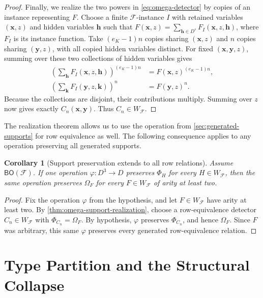 \documentclass[11pt,letterpaper,onecolumn]{article}
\theoremstyle{plain}
\newtheorem{corollary}[corollary]{Corollary}
\theoremstyle{definition}
\theoremstyle{remark}
\newcommand{\cF}{\mathcal F}
\newcommand{\BO}{\mathsf{BO}}
\newcommand{\SuppRel}[1]{\Phi_{#1}}
\newcommand{\RowEq}[1]{\Omega_{#1}}
\begin{document}
\begin{proof}
Finally, we realize the two powers in \eqref{eq:omega-detector} by
copies of an instance representing $F$.  Choose a finite $\cF$-instance $I$
with retained variables $(\mathbf x,z)$ and hidden variables $\mathbf h$
such that $F(\mathbf x,z)=\sum_{\mathbf h\in D^s}F_I(\mathbf x,z,\mathbf h)$,
where $F_I$ is its instance function.  Take $(e_K-1)n$ copies sharing
$(\mathbf x,z)$ and $n$ copies sharing $(\mathbf y,z)$, with all copied
hidden variables distinct.  For fixed $(\mathbf x,\mathbf y,z)$, summing
over these two collections of hidden variables gives
\begin{align*}
  \left(\sum_{\mathbf h}F_I(\mathbf x,z,\mathbf h)\right)^{(e_K-1)n}
    &=F(\mathbf x,z)^{(e_K-1)n},\\
  \left(\sum_{\mathbf k}F_I(\mathbf y,z,\mathbf k)\right)^n
    &=F(\mathbf y,z)^n.
\end{align*}
Because the collections are disjoint, their contributions multiply.
Summing over $z$ now gives exactly $C_n(\mathbf x,\mathbf y)$.
Thus $C_n\in W_{\cF}$.
\end{proof}

The realization theorem allows us to use the operation from
\cref{sec:generated-supports} for row equivalence as well.  The following
consequence applies to any operation preserving all generated supports.

\begin{corollary}[Support preservation extends to all row relations]
\label{cor:omega-reduces-to-supports}
Assume $\BO(\cF)$.  If one operation $\varphi:D^3\to D$ preserves $\SuppRel H$
for every $H\in W_{\cF}$, then the same operation preserves $\RowEq F$ for
every $F\in W_{\cF}$ of arity at least two.
\end{corollary}

\begin{proof}
Fix the operation $\varphi$ from the hypothesis, and let
$F\in W_{\cF}$ have arity at least two.  By
\cref{thm:omega-support-realization}, choose a row-equivalence detector
$C_n\in W_{\cF}$ with $\SuppRel{C_n}=\RowEq F$.  By hypothesis,
$\varphi$ preserves $\SuppRel{C_n}$, and hence $\RowEq F$.
Since $F$ was arbitrary, this same $\varphi$ preserves every generated
row-equivalence relation.
\end{proof}

\section{Type Partition and the Structural Collapse}
\label{sec:type-collapse}
\end{document}
